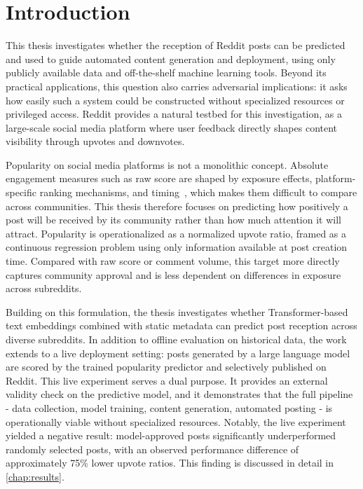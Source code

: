 \chapter{Introduction}
\label{chap:introduction}

This thesis investigates whether the reception of Reddit posts can be predicted and used to guide automated content generation and deployment, using only publicly available data and off-the-shelf machine learning tools. Beyond its practical applications, this question also carries adversarial implications: it asks how easily such a system could be constructed without specialized resources or privileged access. Reddit provides a natural testbed for this investigation, as a large-scale social media platform where user feedback directly shapes content visibility through upvotes and downvotes.

Popularity on social media platforms is not a monolithic concept. Absolute engagement measures such as raw score are shaped by exposure effects, platform-specific ranking mechanisms, and timing~\cite{hessel2019something, stoddard2015popularity}, which makes them difficult to compare across communities. This thesis therefore focuses on predicting how positively a post will be received by its community rather than how much attention it will attract. Popularity is operationalized as a normalized upvote ratio, framed as a continuous regression problem using only information available at post creation time. Compared with raw score or comment volume, this target more directly captures community approval and is less dependent on differences in exposure across subreddits.

Building on this formulation, the thesis investigates whether Transformer-based text embeddings combined with static metadata can predict post reception across diverse subreddits. In addition to offline evaluation on historical data, the work extends to a live deployment setting: posts generated by a large language model are scored by the trained popularity predictor and selectively published on Reddit. This live experiment serves a dual purpose. It provides an external validity check on the predictive model, and it demonstrates that the full pipeline - data collection, model training, content generation, automated posting - is operationally viable without specialized resources. Notably, the live experiment yielded a negative result: model-approved posts significantly underperformed randomly selected posts, with an observed performance difference of approximately 75\% lower upvote ratios. This finding is discussed in detail in \autoref{chap:results}.

